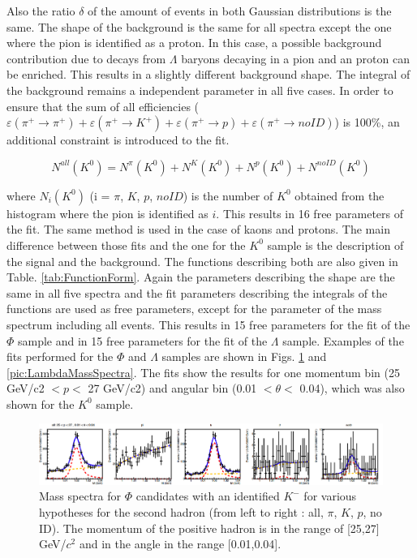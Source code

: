 Also the ratio $\delta$ of the amount of events in both Gaussian distributions is the same. The shape of the background is the same for all spectra except the one where the pion is identified as a proton. In this case, a possible background contribution due to decays from $\Lambda$ baryons decaying in a pion and an proton can be enriched. This results in  a slightly different background shape. The integral of the background remains a independent parameter in all five cases. In order to ensure that the sum of all efficiencies  ($\varepsilon(\pi^+ \rightarrow \pi^+)  + \varepsilon(\pi^+ \rightarrow K^+ ) + \varepsilon(\pi^+ \rightarrow p ) + \varepsilon(\pi^+ \rightarrow noID)$) is 100\%, an additional constraint is introduced to the fit.

\begin{equation}
  N^{all}(K^0) = N^{\pi}(K^0) + N^{K}(K^0) + N^{p}(K^0) + N^{noID}(K^0)
\end{equation}

where $N_i(K^0)$ (i = $\pi$, $K$, $p$, $noID$) is the number of $K^0$ obtained from the histogram where the pion is identified as $i$. This results in 16 free parameters of the fit. The same method is used in the case of kaons and protons. The main difference between those fits and the one for the $K^0$ sample is the description of the signal and the background. The functions describing both are also given in Table. \ref{tab:FunctionForm}. Again the parameters describing the shape are the same in all five spectra and the fit parameters  describing the integrals of the functions are used as free parameters, except for the parameter of the mass spectrum including all events. This results in 15 free parameters for the fit of the $\Phi$ sample and in 15 free parameters for the fit of the $\Lambda$ sample. Examples of the fits performed for the $\Phi$ and $\Lambda$ samples are shown in Figs. \ref{pic:PhiMassSpectra} and \ref{pic:LambdaMassSpectra}. The fits show the results for one momentum bin (25 GeV/c2 $< p <$ 27 GeV/c2) and angular bin (0.01 $< \theta <$ 0.04), which was also shown for the $K^0$ sample.

\begin{figure}[!h]
  \centering
	\includegraphics[scale=0.3]{./gfx/PhiMassSpectra.png}
	\caption{Mass spectra for $\Phi$ candidates with an identified $K^-$ for various hypotheses for the second hadron (from left to right : all, $\pi$, $K$, $p$, no ID). The momentum of the positive hadron is in the range of [25,27] GeV/$c^2$ and in the angle in the range [0.01,0.04].}
	\label{pic:PhiMassSpectra}
\end{figure}

